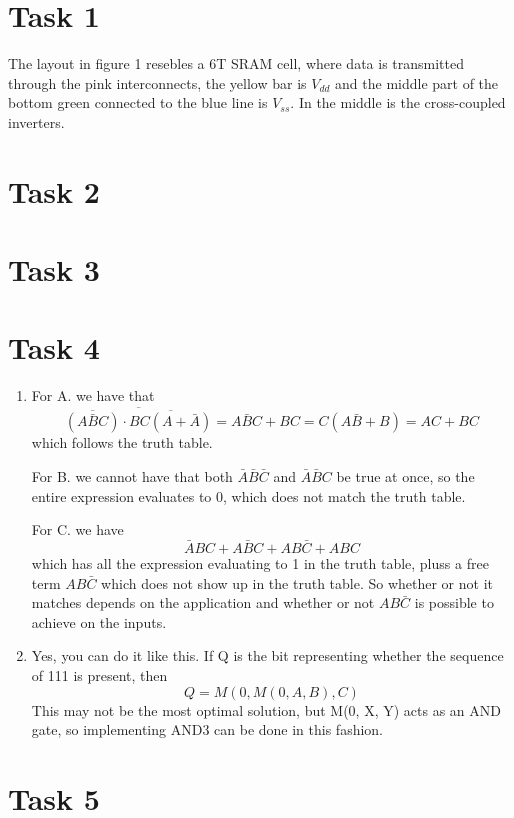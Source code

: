 \documentclass[a4paper,11pt,norsk]{article}
\begin{document}


\section*{Task 1}
The layout in figure 1 resebles a 6T SRAM cell, where data is transmitted through the pink interconnects,
the yellow bar is $V_{dd}$ and the middle part of the bottom green connected to the blue line is $V_{ss}$.
In the middle is the cross-coupled inverters.

\section*{Task 2}

\section*{Task 3}

\section*{Task 4}
\begin{enumerate}
    \item For A. we have that
        \[
            \overline{\overline{(A\bar{B}C)} \cdot \overline{BC(A + \bar{A})}} = A\bar{B}C + BC = C(A\bar{B} + B) = AC + BC
        \]
        which follows the truth table.

        For B. we cannot have that both $\bar{A}\bar{B}\bar{C}$ and $\bar{A}\bar{B}C$ be true at once, so the entire 
        expression evaluates to 0, which does not match the truth table.

        For C. we have 
        \[
            \bar{A}BC + A\bar{B}C + AB\bar{C} + ABC
        \]
        which has all the expression evaluating to 1 in the truth table, pluss a free term $AB\bar{C}$ which does not show up in the truth 
        table. So whether or not it matches depends on the application and whether or not $AB\bar{C}$ is possible to 
        achieve on the inputs.
    \item Yes, you can do it like this. If Q is the bit representing whether the sequence of 111 is present, then
        \[
            Q = M(0, M(0, A, B), C)
        \]
        This may not be the most optimal solution, but M(0, X, Y) acts as an AND gate, so implementing AND3 can be done in this 
        fashion.
\end{enumerate}

\section*{Task 5}
\end{document}
